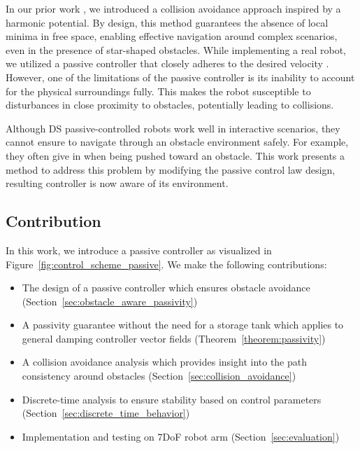 In our prior work \cite{huber2019avoidance, huber2023avoidance}, we introduced a collision avoidance approach inspired by a harmonic potential. By design, this method guarantees the absence of local minima in free space, enabling effective navigation around complex scenarios, even in the presence of star-shaped obstacles.
While implementing a real robot, we utilized a passive controller that closely adheres to the desired velocity \cite{kronander2015passive}. However, one of the limitations of the passive controller is its inability to account for the physical surroundings fully. This makes the robot susceptible to disturbances in close proximity to obstacles, potentially leading to collisions.


Although DS passive-controlled robots work well in interactive scenarios, they cannot ensure to navigate through an obstacle environment safely. For example, they often give in when being pushed toward an obstacle. This work presents a method to address this problem by modifying the passive control law design, resulting controller is now aware of its environment.

\subsection{Contribution}
In this work, we introduce a passive controller as visualized in Figure~\ref{fig:control_scheme_passive}. We make the following contributions:

\begin{itemize}
\item The design of a passive controller which ensures obstacle avoidance (Section~\ref{sec:obstacle_aware_passivity})
\item A passivity guarantee without the need for a storage tank which applies to general damping controller vector fields (Theorem~\ref{theorem:passivity})
\item A collision avoidance analysis which provides insight into the path consistency around obstacles (Section~\ref{sec:collision_avoidance})
\item Discrete-time analysis to ensure stability based on control parameters (Section~\ref{sec:discrete_time_behavior})
\item Implementation and testing on 7DoF robot arm (Section~\ref{sec:evaluation})
\end{itemize}

